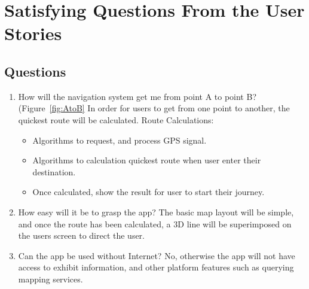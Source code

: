 {\section{Satisfying Questions From the User Stories}
\subsection*{Questions}
\begin{enumerate}
    \item How will the navigation system get me from point A to point B? (Figure~\ref{fig:AtoB}
    In order for users to get from one point to another, the quickest route will be calculated.
    Route Calculations:
    \begin{itemize}
        \item Algorithms to request, and process GPS signal.
        \item Algorithms to calculation quickest route when user enter their destination.
        \item Once calculated, show the result for user to start their journey.
    \end{itemize}
    
    \item How easy will it be to grasp the app?
    The basic map layout will be simple, and once the route has been calculated, a 3D line will be superimposed on the users screen to direct the user.
    
    \item Can the app be used without Internet? 
    No, otherwise the app will not have access to exhibit information, and other platform features such as querying mapping services.

\end{enumerate}

}